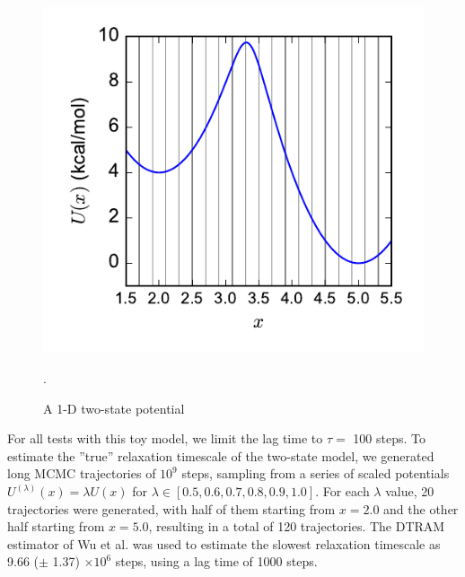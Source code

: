 \documentclass[%
 aip,
rsi,%
 amsmath,amssymb,
 reprint,%
]{revtex4-1}
\begin{document}
\begin{figure}[ht!]
    \includegraphics[width=0.9\columnwidth]{figures/1D-potential}
    \caption{A 1-D two-state potential}.
    \label{fig:1D-potential}
\end{figure}

For all tests with this toy model, we limit the lag time to $\tau =$ 100 steps.  To estimate the ''true'' relaxation timescale of the two-state model, we generated long MCMC trajectories of $10^9$ steps, sampling from a series of scaled potentials $U^{(\lambda)}(x) = \lambda U(x)$ for $\lambda \in [0.5, 0.6, 0.7, 0.8, 0.9, 1.0]$. For each $\lambda$ value, 20 trajectories were generated, with half of them starting from $x=2.0$ and the other half starting from $x=5.0$, resulting in a total of 120 trajectories.  The DTRAM estimator of Wu et al.\cite{Wu:2014jy} was used to estimate the slowest relaxation timescale as 9.66 ($\pm$ 1.37) $\times 10^6$ steps, using a lag time of 1000 steps.
\end{document}
